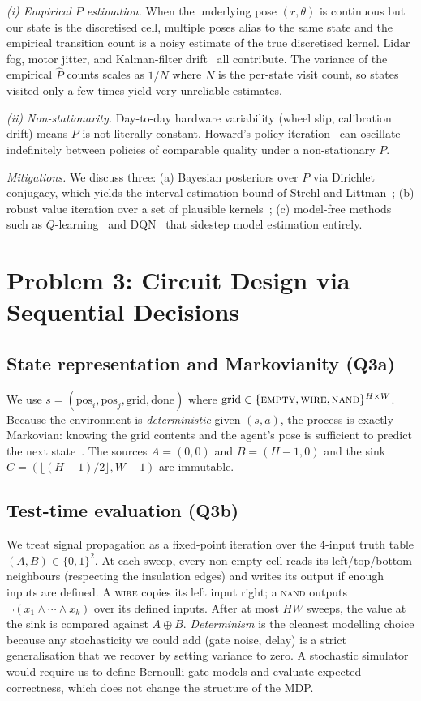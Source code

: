 \documentclass[11pt,letterpaper]{article}
\begin{document}
\emph{(i) Empirical $P$ estimation.} When the underlying pose $(r,\theta)$ is continuous but our state is the discretised cell, multiple poses alias to the same state and the empirical transition count is a noisy estimate of the true discretised kernel. Lidar fog, motor jitter, and Kalman-filter drift~\cite{kalman1960new} all contribute. The variance of the empirical $\widehat{P}$ counts scales as $1/N$ where $N$ is the per-state visit count, so states visited only a few times yield very unreliable estimates.

\emph{(ii) Non-stationarity.} Day-to-day hardware variability (wheel slip, calibration drift) means $P$ is not literally constant. Howard's policy iteration~\cite{howard1960dynamic} can oscillate indefinitely between policies of comparable quality under a non-stationary $P$.

\emph{Mitigations.} We discuss three: (a) Bayesian posteriors over $P$ via Dirichlet conjugacy, which yields the interval-estimation bound of Strehl and Littman~\cite{strehl2008pac}; (b) robust value iteration over a set of plausible kernels~\cite{iyengar2005robust,wiesemann2013robust}; (c) model-free methods such as $Q$-learning~\cite{watkins1992q} and DQN~\cite{mnih2015human} that sidestep model estimation entirely.

\section{Problem 3: Circuit Design via Sequential Decisions}\label{sec:p3}
\subsection{State representation and Markovianity (Q3a)}
We use $s=(\text{pos}_{i},\text{pos}_{j},\text{grid},\text{done})$ where $\text{grid}\in\{\textsc{empty},\textsc{wire},\textsc{nand}\}^{H\times W}$. Because the environment is \emph{deterministic} given $(s,a)$, the process is exactly Markovian: knowing the grid contents and the agent's pose is sufficient to predict the next state~\cite{sutton2018reinforcement}. The sources $A=(0,0)$ and $B=(H-1,0)$ and the sink $C=(\lfloor(H-1)/2\rfloor,W-1)$ are immutable.

\subsection{Test-time evaluation (Q3b)}
We treat signal propagation as a fixed-point iteration over the 4-input truth table $(A,B)\in\{0,1\}^{2}$. At each sweep, every non-empty cell reads its left/top/bottom neighbours (respecting the insulation edges) and writes its output if enough inputs are defined. A \textsc{wire} copies its left input right; a \textsc{nand} outputs $\neg(x_{1}\wedge\cdots\wedge x_{k})$ over its defined inputs. After at most $HW$ sweeps, the value at the sink is compared against $A\oplus B$. \emph{Determinism} is the cleanest modelling choice because any stochasticity we could add (gate noise, delay) is a strict generalisation that we recover by setting variance to zero. A stochastic simulator would require us to define Bernoulli gate models and evaluate expected correctness, which does not change the structure of the MDP.
\end{document}
